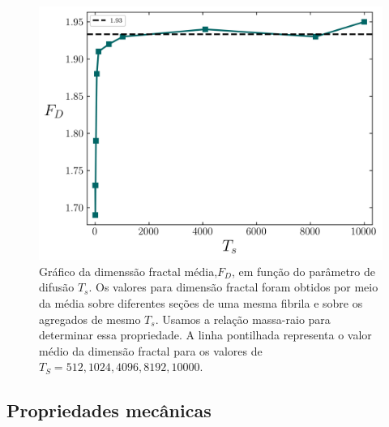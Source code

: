 \documentclass{article}
\begin{document}
    \begin{figure}[H]
        \centering
        \includegraphics[width=\textwidth]{figures/dim_frac.png}

        \caption{ Gráfico da dimenssão fractal média,\(F_{D}\), em função do parâmetro de difusão \(T_{s}\). Os valores para 
        dimensão fractal foram obtidos por meio da média sobre diferentes seções de uma mesma fibrila e sobre os agregados
        de mesmo  \(T_{s}\). Usamos a relação massa-raio para determinar essa propriedade. A linha pontilhada representa 
        o valor médio da dimensão fractal para os valores de \(T_{S}=512,1024,4096,8192,10000\).} 

        \label{R4}
    \end{figure}


    \subsection{Propriedades mecânicas}
\end{document}
